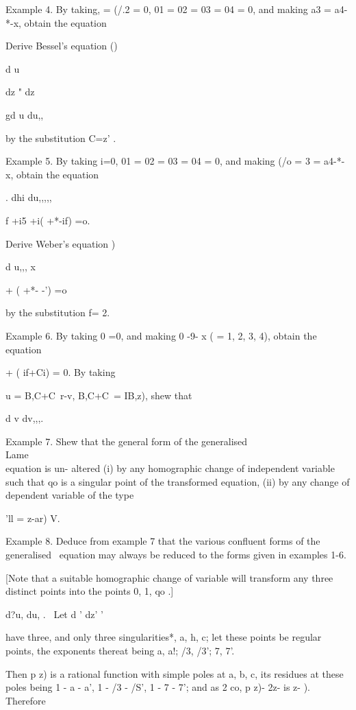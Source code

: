 Example 4. By taking, = (/.2 = 0, 01 = 02 = 03 = 04 = 0, and making
a3 = a4-*-x, obtain the equation

Derive Bessel's equation ()

d u

dz " dz

gd u du,,

by the substitution C=z' .

Example 5. By taking i=0, 01 = 02 = 03 = 04 = 0, and making (/o = 3 =
a4-*-x, obtain the equation

. dhi du,,,,,

f +i5 +i( +*-if) =o.

Derive Weber's equation )

d u,,, x

  + ( +*- -') =o

by the substitution f= 2.

Example 6. By taking 0 =0, and making 0 -9- x ( = 1, 2, 3, 4), obtain
the equation

  + ( if+Ci) = 0. By taking

u = B,C+C\ r-v, B,C+C\ = IB,z), shew that

 d v dv,,,.

%
%

Example 7. Shew that the general form of the generalised \\Lame\\ equation
is un- altered (i) by any homographic change of independent variable
such that qo is a singular point of the transformed equation, (ii) by
any change of dependent variable of the type

'll = z-ar) V.

Example 8. Deduce from example 7 that the various confluent forms of
the generalised \Lame\ equation may always be reduced to the forms given
in examples 1-6.

[Note that a suitable homographic change of variable will transform
any three distinct points into the points 0, 1, qo .]


d?u, du, . \ Let d ' dz' '

have three, and only three singularities*, a, h, c; let these points
be regular points, the exponents thereat being a, a!; /3, /3'; 7,
7'.

Then p z) is a rational function with simple poles at a, b, c, its
residues at these poles being 1 - a - a', 1 - /3 - /S', 1 - 7 - 7';
and as 2 co, p z)- 2z- is z- ). Therefore

